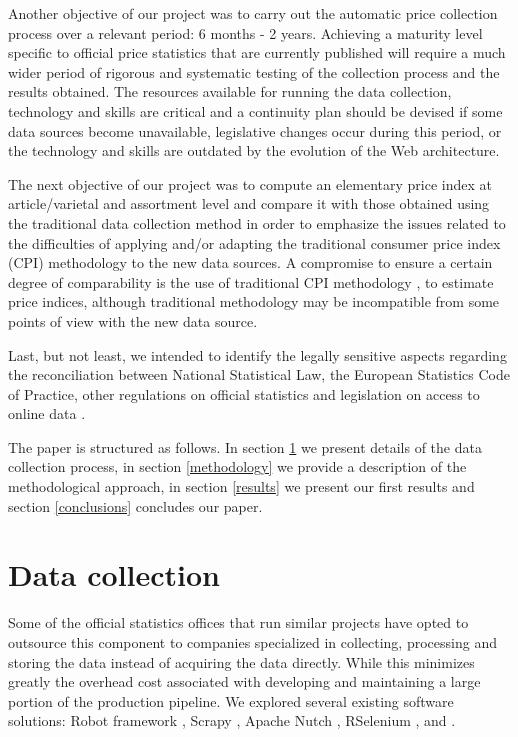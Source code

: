 \documentclass[]{article}
\begin{document}
Another objective of our project was to carry out the automatic price collection process over a relevant period: 6 months - 2 years. 
Achieving a maturity level specific to official price statistics that are currently published will require a much wider period of 
rigorous and systematic testing of the collection process and the results obtained. The resources available for running the data 
collection, technology and skills are critical and a continuity plan should be devised if some data sources become unavailable, 
legislative changes occur during this period, or the technology and skills are outdated by the evolution of the Web architecture. 


The next objective of our project was to compute an elementary price index at article/varietal and assortment level and compare 
it with those obtained using the traditional data collection method in order to emphasize the issues related to the difficulties 
of applying and/or adapting the traditional consumer price index (CPI) methodology \cite{cpi} to the new data sources.  A compromise to 
ensure a certain degree of comparability is the use of traditional CPI methodology \cite{cpi2}, \cite{cpi3} to estimate price indices, although 
traditional methodology may be incompatible from some points of view with the new data source. 


Last, but not least, we intended to identify the legally sensitive aspects regarding the reconciliation between National Statistical Law, the European Statistics Code of Practice, other regulations on official statistics and legislation on access to online data \cite{swier}.

The paper is structured as follows. In section \ref{section2} we present details of the data collection process, in section \ref{methodology} we provide a description of the methodological approach, in section \ref{results} we present our first results and section \ref{conclusions} concludes our paper.


\section{Data collection}\label{section2}
 
Some of the official statistics offices that run similar projects have opted to outsource this component to companies specialized 
in collecting, processing and storing the data instead of acquiring the data directly. While this minimizes greatly the overhead 
cost associated with developing and maintaining a large portion of the production pipeline. We explored several existing software solutions: 
Robot framework \cite{robot2018}, Scrapy \cite{scrapy1}, \cite{scrapy2} Apache Nutch \cite{nutch}, RSelenium \cite{rs1}, and \cite{rvest}. 
\end{document}

